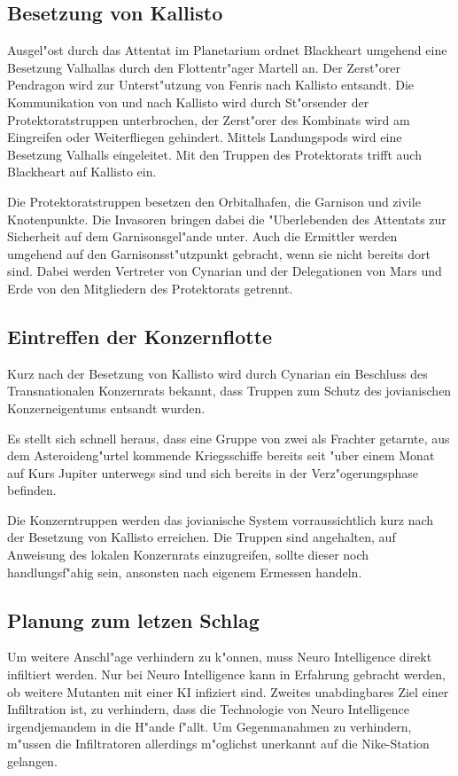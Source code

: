 \subsection{Besetzung von Kallisto}

Ausgel"ost durch das Attentat im Planetarium ordnet Blackheart umgehend eine Besetzung Valhallas durch den Flottentr"ager Martell an. Der Zerst"orer Pendragon wird zur Unterst"utzung von Fenris nach Kallisto entsandt. Die Kommunikation von und nach Kallisto wird durch St"orsender der Protektoratstruppen unterbrochen, der Zerst"orer des Kombinats wird am Eingreifen oder Weiterfliegen gehindert. Mittels Landungspods wird eine Besetzung Valhalls eingeleitet. Mit den Truppen des Protektorats trifft auch Blackheart auf Kallisto ein.

Die Protektoratstruppen besetzen den Orbitalhafen, die Garnison und zivile Knotenpunkte. Die Invasoren bringen dabei die "Uberlebenden des Attentats zur Sicherheit auf dem Garnisonsgel"ande unter. Auch die Ermittler werden umgehend auf den Garnisonsst"utzpunkt gebracht, wenn sie nicht bereits dort sind. Dabei werden Vertreter von Cynarian und der Delegationen von Mars und Erde von den Mitgliedern des Protektorats getrennt.

\subsection{Eintreffen der Konzernflotte}

Kurz nach der Besetzung von Kallisto wird durch Cynarian ein Beschluss des Transnationalen Konzernrats bekannt, dass Truppen zum Schutz des jovianischen Konzerneigentums entsandt wurden.

Es stellt sich schnell heraus, dass eine Gruppe von zwei als Frachter getarnte, aus dem Asteroideng"urtel kommende Kriegsschiffe bereits seit "uber einem Monat auf Kurs Jupiter unterwegs sind und sich bereits in der Verz"ogerungsphase befinden.

Die Konzerntruppen werden das jovianische System vorraussichtlich kurz nach der Besetzung von Kallisto erreichen. Die Truppen sind angehalten, auf Anweisung des lokalen Konzernrats einzugreifen, sollte dieser noch handlungsf"ahig sein, ansonsten nach eigenem Ermessen handeln.

\subsection{Planung zum letzen Schlag}

Um weitere Anschl"age verhindern zu k"onnen, muss Neuro Intelligence direkt infiltiert werden. Nur bei Neuro Intelligence kann in Erfahrung gebracht werden, ob weitere Mutanten mit einer KI infiziert sind. Zweites unabdingbares Ziel einer Infiltration ist, zu verhindern, dass die Technologie von Neuro Intelligence irgendjemandem in die H"ande f"allt. Um Gegenma\3nahmen zu verhindern, m"ussen die Infiltratoren allerdings m"oglichst unerkannt auf die Nike-Station gelangen.

